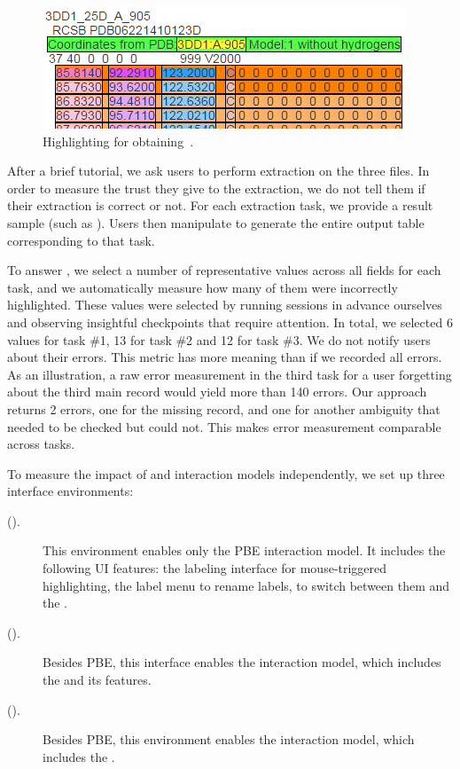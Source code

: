 \begin{figure}[t]
    \centering
    \includegraphics[width=0.7\columnwidth]{figures/hydrogenhybrid}
    \caption{Highlighting for obtaining~.}
    \label{fig:interactive:evaluation:highlighting}
\end{figure}

After a brief tutorial, we ask users to perform extraction on the three files.
In order to measure the trust they give to the extraction, we do not tell them if their extraction is correct or not.
For each extraction task, we provide a result sample (such as ).
Users then manipulate \FlashProg to generate the entire output table corresponding to that task.

To answer \RQOneShort, we select a number of representative values across all fields
for each task, and we automatically measure how many of them were incorrectly highlighted.
These values were selected by running \FlashProg sessions in advance
ourselves and observing insightful checkpoints that require attention.
In total, we selected 6 values for task \#1, 13 for task \#2 and 12 for task \#3.
We do not notify users about their errors.
This metric has more meaning than if we recorded all errors.
As an illustration, a raw error measurement in the third task for a user forgetting about the third main record would
yield more than 140 errors.
Our approach returns 2 errors, one for the missing record, and one for another ambiguity that needed to be checked but
could not.
This makes error measurement comparable across tasks.

To measure the impact of \ProgramNavigation and \ConversationalClarification interaction models
independently, we set up three interface environments:

\begin{description}
    \item[\BIdef (\BI).] This environment enables only the PBE interaction model.
        It includes the following UI features: the labeling interface for mouse-triggered highlighting, the
        label menu to rename labels, to switch between them and the \OutputTab.
    \item[\BIPWdef (\BIPW).] Besides PBE, this interface enables the
        \ProgramNavigation interaction model, which includes the \ProgramNavigationTab and its features.
    \item[\BIDTdef (\BIDT).] Besides PBE, this environment enables the
        \ConversationalClarification interaction model, which includes the \ConversationalClarificationTab.
\end{description}


